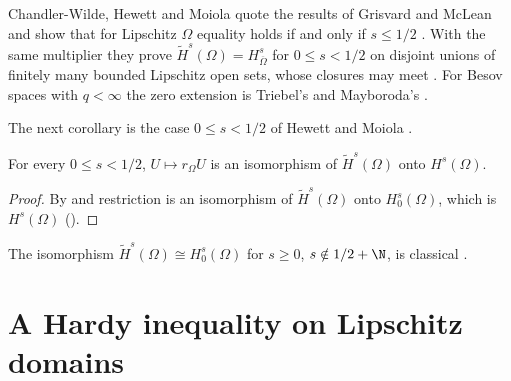 Chandler-Wilde, Hewett and Moiola quote the results of Grisvard and McLean and show that for
Lipschitz $\Omega$ equality holds if and only if $s \leq 1/2$
\cite[Corollary 3.29(ix)]{ChandlerWildeHewettMoiola}. With the same multiplier they prove
$\tilde H^s(\Omega) = H^s_{\overline\Omega}$ for $0 \leq s < 1/2$ on disjoint unions of finitely
many bounded Lipschitz open sets, whose closures may meet
\cite[Lemma 3.21]{ChandlerWildeHewettMoiola}. For Besov spaces with $q < \infty$ the zero extension
is Triebel's \cite[Proposition 3.1(ii)]{Triebel2002} and Mayboroda's
\cite[Proposition 3.6.6]{Mayboroda2005}.

The next corollary is the case $0 \leq s < 1/2$ of Hewett and Moiola
\cite[Lemma 2.1 and Remark 2.6]{HewettMoiola}.

\begin{corollary}
\label{cor:tilde-restriction-small}
\leanok
{}
For every $0 \leq s < 1/2$, $U \mapsto r_\Omega U$ is an isomorphism of $\tilde H^s(\Omega)$ onto
$H^s(\Omega)$.
\end{corollary}

\begin{proof}
\leanok
By  and  restriction is an
isomorphism of $\tilde H^s(\Omega)$ onto $H^s_0(\Omega)$, which is $H^s(\Omega)$
().
\end{proof}

The isomorphism $\tilde H^s(\Omega) \cong H^s_0(\Omega)$ for $s \geq 0$, $s \notin 1/2 + \N$, is
classical \cite[Theorem 3.33]{McLean}.

\section{A Hardy inequality on Lipschitz domains}
\label{sec:fractional-hardy}

